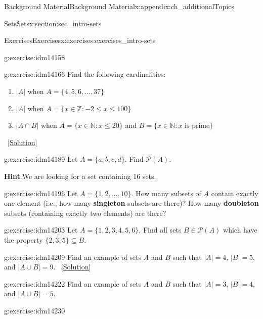 \documentclass[oneside,10pt,]{book}
\newcommand{\terminology}[1]{\textbf{#1}}
\numberwithin{equation}{chapter}
\def\N{\mathbb N}
\def\Z{\mathbb Z}
\def\pow{\mathcal P}
\def\st{:}
\begin{document}
\begin{appendixptx}{Background Material}{}{Background Material}{}{}{x:appendix:ch_additionalTopics}
\begin{sectionptx}{Sets}{}{Sets}{}{}{x:section:sec_intro-sets}
\begin{exercises-subsection}{Exercises}{}{Exercises}{}{}{x:exercises:exercises_intro-sets}
\begin{divisionexercise}{8}{}{}{g:exercise:idm14158}
\begin{sidebyside}{1}{0.4}{0.4}{0}
\begin{sbspanel}{0.2}
{\begin{tikzpicture}[fill=gray!50, scale=0.5]
\end{tikzpicture}
}%
\end{sbspanel}%
\end{sidebyside}%
\end{divisionexercise}%
\begin{divisionexercise}{9}{}{}{g:exercise:idm14166}%
Find the following cardinalities:%
\begin{enumerate}[label=(\alph*)]
\item{}\(|A|\) when \(A = \{4,5,6,\ldots,37\}\)%
\item{}\(|A|\) when \(A = \{x \in \Z \st -2 \le x \le 100\}\)%
\item{}\(|A \cap B|\) when \(A = \{x \in \N \st x \le 20\}\) and \(B = \{x \in \N \st x \mbox{ is prime} \}\)%
\end{enumerate}
%
\qquad~\hfill{\tiny\hyperlink{g:solution:idm14180-main}{[Solution]}}\end{divisionexercise}%
\begin{divisionexercise}{10}{}{}{g:exercise:idm14189}%
Let \(A = \{a, b, c, d\}\). Find \(\pow(A)\).%
\par\smallskip%
\noindent\textbf{Hint}.\hypertarget{g:hint:idm14194}{}\quad{}We are looking for a set containing 16 sets.%
\end{divisionexercise}%
\begin{divisionexercise}{11}{}{}{g:exercise:idm14196}%
Let \(A = \{1,2,\ldots, 10\}\). How many subsets of \(A\) contain exactly one element (i.e., how many \terminology{singleton} subsets are there)? How many \terminology{doubleton} subsets (containing exactly two elements) are there?%
\end{divisionexercise}%
\begin{divisionexercise}{12}{}{}{g:exercise:idm14203}%
Let \(A = \{1,2,3,4,5,6\}\). Find all sets \(B \in \pow(A)\) which have the property \(\{2,3,5\} \subseteq B\).%
\end{divisionexercise}%
\begin{divisionexercise}{13}{}{}{g:exercise:idm14209}%
Find an example of sets \(A\) and \(B\) such that \(|A| = 4\), \(|B| = 5\), and \(|A \cup B| = 9\).%
\qquad~\hfill{\tiny\hyperlink{g:solution:idm14217-main}{[Solution]}}\end{divisionexercise}%
\begin{divisionexercise}{14}{}{}{g:exercise:idm14222}%
Find an example of sets \(A\) and \(B\) such that \(|A| = 3\), \(|B| = 4\), and \(|A \cup B| = 5\).%
\end{divisionexercise}%
\begin{divisionexercise}{15}{}{}{g:exercise:idm14230}%

\end{divisionexercise}
\end{exercises-subsection}
\end{sectionptx}
\end{appendixptx}
\end{document}
